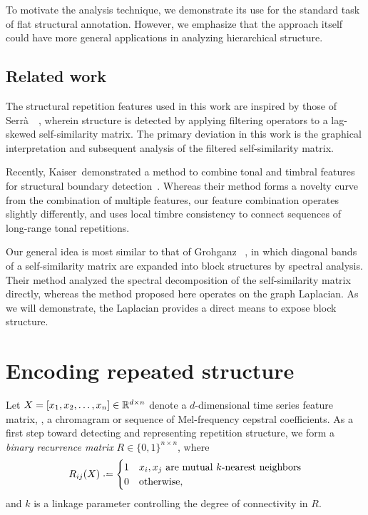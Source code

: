 \documentclass{article}
\begin{document}
To motivate the analysis technique, we demonstrate its use for the
standard task of flat structural annotation.  However, we emphasize that the approach
itself could have more general applications in analyzing hierarchical structure.

\subsection{Related work}

The structural repetition features used in this work are inspired by those of
Serr\`{a}~\etal~\cite{serra2012unsupervised}, wherein structure is detected by 
applying filtering operators to a lag-skewed self-similarity matrix.  The primary
deviation in this work is the graphical interpretation and subsequent analysis of 
the filtered self-similarity matrix.

Recently, Kaiser~\etal demonstrated a method to combine tonal and timbral features for
structural boundary detection~\cite{kaiser2013simple}.  Whereas their method forms a
novelty curve from the combination of multiple features, our feature combination
operates slightly differently, and uses local timbre consistency to connect sequences
of long-range tonal repetitions.

Our general idea is most similar to that of Grohganz \etal~\cite{grohganz2013converting},
in which diagonal bands of a self-similarity matrix are expanded into block structures
by spectral analysis.  Their method analyzed the spectral decomposition of the 
self-similarity matrix directly, whereas the method proposed here operates on the
graph Laplacian.  As we will demonstrate, the Laplacian provides a direct means to
expose block structure.

\section{Encoding repeated structure}

Let $X = [x_1, x_2, \dots, x_n] \in \mathbb{R}^{d\times n}$ denote a $d$-dimensional time
series feature matrix, \eg, a chromagram or sequence of Mel-frequency cepstral 
coefficients.  As a first step toward detecting and representing repetition structure, 
we form a \emph{binary recurrence matrix} $R \in \{0,1\}^{n\times n}$, where 
\begin{equation}
R_{ij}(X) \defeq \begin{cases}
1 & x_i, x_j \text{ are mutual $k$-nearest neighbors}\\
0 & \text{otherwise},
\end{cases}
\end{equation}
and $k$ is a linkage parameter controlling the degree of connectivity in $R$.
\end{document}
